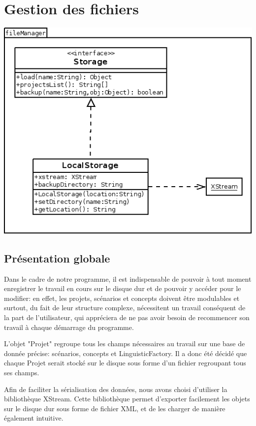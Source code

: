 \documentclass[12pt]{report}
\begin{document}
\section{Gestion des fichiers}


\begin{center}
\includegraphics[scale=0.55]{diversuml/fileManager.png}
\end{center}


\subsection{Présentation globale}

	Dans le cadre de notre programme, il est indispensable de pouvoir à tout moment enregistrer le travail en cours sur
le disque dur et de pouvoir y accéder pour le modifier: en effet, les projets, scénarios et concepts doivent être modulables
et surtout, du fait de leur structure complexe, nécessitent un travail conséquent de la part de l'utilisateur, qui appréciera
de ne pas avoir besoin de recommencer son travail à chaque démarrage du programme.

	L'objet "Projet" regroupe tous les champs nécessaires au travail sur une base de donnée précise: scénarios, concepts et LinguisticFactory.
Il a donc été décidé que chaque Projet serait stocké sur le disque sous forme d'un fichier regroupant tous ses champs.

	Afin de faciliter la sérialisation des données, nous avons choisi d'utiliser la bibliothèque XStream.
Cette bibliothèque permet d'exporter facilement les objets sur le disque dur sous forme de fichier XML, et de les charger de manière également
intuitive.
\end{document}
